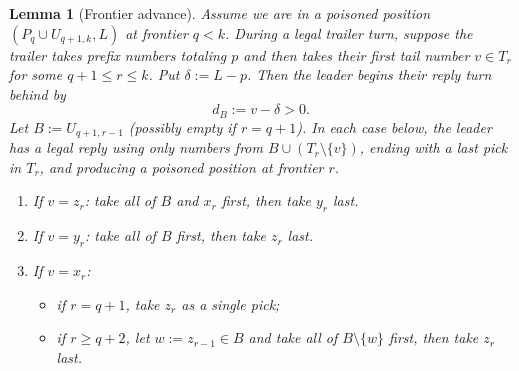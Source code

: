 \documentclass[11pt]{article}
\newtheorem{lemma}[theorem]{Lemma}
\begin{document}
\begin{lemma}[Frontier advance]\label{lem:advance}
Assume we are in a poisoned position $(P_q\cup U_{q+1,k},L)$ at frontier $q<k$.
During a legal trailer turn, suppose the trailer takes prefix numbers totaling $p$ and then takes their first tail number
$v\in T_r$ for some $q+1\le r\le k$. Put $\delta:=L-p$.
Then the leader begins their reply turn behind by
\[
d_B:=v-\delta>0.
\]
Let $B:=U_{q+1,r-1}$ (possibly empty if $r=q+1$). In each case below, the leader has a legal reply using only numbers from
$B\cup(T_r\setminus\{v\})$, ending with a last pick in $T_r$, and producing a poisoned position at frontier $r$.

\begin{enumerate}
\item If $v=z_r$: take all of $B$ and $x_r$ first, then take $y_r$ last.
\item If $v=y_r$: take all of $B$ first, then take $z_r$ last.
\item If $v=x_r$:
\begin{itemize}
\item if $r=q+1$, take $z_r$ as a single pick;
\item if $r\ge q+2$, let $w:=z_{r-1}\in B$ and take all of $B\setminus\{w\}$ first, then take $z_r$ last.
\end{itemize}
\end{enumerate}
\end{lemma}
\end{document}
